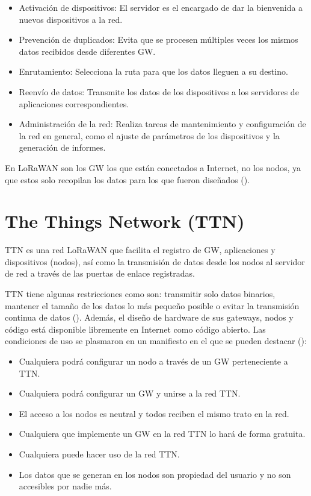 \begin{itemize}
    \item Activación de dispositivos: El servidor es el encargado de dar la bienvenida a nuevos dispositivos a la red.
    \item Prevención de duplicados: Evita que se procesen múltiples veces los mismos datos recibidos desde diferentes GW.
    \item Enrutamiento: Selecciona la ruta para que los datos lleguen a su destino.
    \item Reenvío de datos: Transmite los datos de los dispositivos a los servidores de aplicaciones correspondientes.
    \item Administración de la red: Realiza tareas de mantenimiento y configuración de la red en general, como el ajuste de parámetros de los dispositivos y la generación de informes.
\end{itemize}

En LoRaWAN son los GW los que están conectados a Internet, no los nodos, ya que estos solo recopilan los datos para los que fueron diseñados (\cite{morales2021}).

\section{The Things Network (TTN)}

TTN es una red LoRaWAN que facilita el registro de GW, aplicaciones y dispositivos (nodos), así como la transmisión de datos desde los nodos al servidor de red a través de las puertas de enlace registradas. 

\vspace{0.5cm}

TTN tiene algunas restricciones como son: transmitir solo datos binarios, mantener el tamaño de los datos lo más pequeño posible o evitar la transmisión continua de datos (\cite{thasjohn2023arduino}). Además, el diseño de hardware de sus gateways, nodos y código está disponible libremente en Internet como código abierto. Las condiciones de uso se plasmaron en un manifiesto en el que se pueden destacar (\cite{escribano2021sistema}):

\begin{itemize}
    \item Cualquiera podrá configurar un nodo a través de un GW perteneciente a TTN.
    \item Cualquiera podrá configurar un GW y unirse a la red TTN.
    \item El acceso a los nodos es neutral y todos reciben el mismo trato en la red.
    \item Cualquiera que implemente un GW en la red TTN lo hará de forma gratuita.
    \item Cualquiera puede hacer uso de la red TTN.
    \item Los datos que se generan en los nodos son propiedad del usuario y no son accesibles por nadie más.
\end{itemize}

